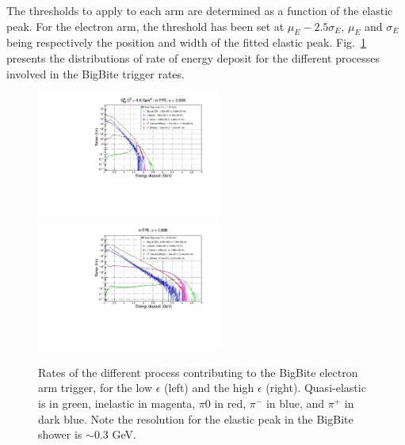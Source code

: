 The thresholds to apply to each arm are determined as a function of the elastic peak.
For the electron arm, the threshold has been set at $\mu_E - 2.5 \sigma_E$,  $\mu_E$ and $\sigma_E$ being respectively the position and width of the fitted elastic peak. 
Fig.~\ref{fig:BBRates} presents the distributions of rate of energy deposit for the different processes involved in the BigBite trigger rates. 

\begin{figure}[!h]
  \centering
    \includegraphics[width=6cm]{Plots/BBECalRates_gen-tpe_le.pdf}
    \includegraphics[width=6cm]{Plots/BBECalRates_gen-tpe_he.pdf}
    \caption{Rates of the different process contributing to the BigBite electron arm trigger, for the low $\epsilon$ (left) and the high $\epsilon$ (right). Quasi-elastic is in green, inelastic in magenta, $\pi0$ in red, $\pi^-$ in blue, and $\pi^+$ in dark blue. Note the resolution for the elastic peak in the BigBite shower is $\sim0.3$ GeV.}
    \label{fig:BBRates}
\end{figure}

